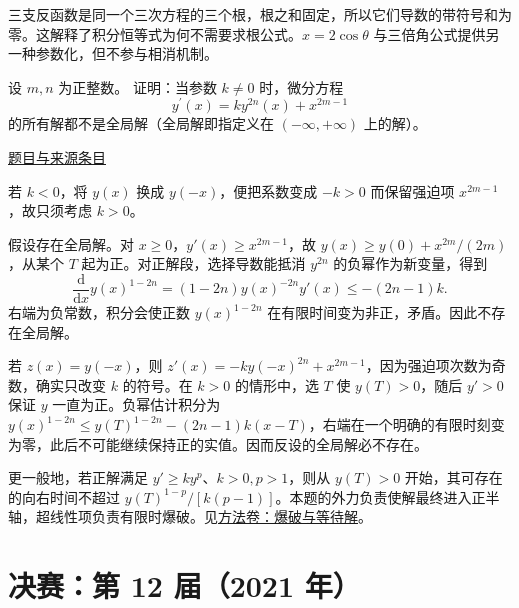\documentclass[12pt,fontset=fandol]{ctexart}
\begin{document}
\begin{remark}[方法与条件]三支反函数是同一个三次方程的三个根，根之和固定，所以它们导数的带符号和为零。这解释了积分恒等式为何不需要求根公式。$x=2\cos\theta$ 与三倍角公式提供另一种参数化，但不参与相消机制。\end{remark}

\begin{example}\label{ex:fin11-low:9}\label{pr:fin11-low:9}

设 $m, n$ 为正整数。 证明：当参数 $k \neq 0$ 时，微分方程
\[
y^{\prime}(x) = ky^{2n}(x) + x^{2m-1}
\]
的所有解都不是全局解（全局解即指定义在 $(-\infty,+\infty)$ 上的解）。

\par\href{https://github.com/lzxcr/cmc-mathematics/blob/64916fa1fdbc3e444a652eca204d5669058ee321/src/problems/finals/11/10.md}{题目与来源条目}

\end{example}

\begin{solve}\label{ans:fin11-low:9}

若 $k<0$，将 $y(x)$ 换成 $y(-x)$，便把系数变成 $-k>0$ 而保留强迫项 $x^{2m-1}$，故只须考虑 $k>0$。

假设存在全局解。对 $x\geq0$，$y'(x)\geq x^{2m-1}$，故 $y(x)\geq y(0)+x^{2m}/(2m)$，从某个 $T$ 起为正。对正解段，选择导数能抵消 $y^{2n}$ 的负幂作为新变量，得到
\[
\frac{\mathrm d}{\mathrm dx}y(x)^{1-2n}=(1-2n)y(x)^{-2n}y'(x)\leq-(2n-1)k.
\]
右端为负常数，积分会使正数 $y(x)^{1-2n}$ 在有限时间变为非正，矛盾。因此不存在全局解。

若 $z(x)=y(-x)$，则 $z'(x)=-ky(-x)^{2n}+x^{2m-1}$，因为强迫项次数为奇数，确实只改变 $k$ 的符号。在 $k>0$ 的情形中，选 $T$ 使 $y(T)>0$，随后 $y'>0$ 保证 $y$ 一直为正。负幂估计积分为 $y(x)^{1-2n}\le y(T)^{1-2n}-(2n-1)k(x-T)$，右端在一个明确的有限时刻变为零，此后不可能继续保持正的实值。因而反设的全局解必不存在。

\end{solve}

\begin{remark}[方法与条件]更一般地，若正解满足 $y'\geq ky^p$、$k>0,p>1$，则从 $y(T)>0$ 开始，其可存在的向右时间不超过 $y(T)^{1-p}/[k(p-1)]$。本题的外力负责使解最终进入正半轴，超线性项负责有限时爆破。见\hyperref[app:dynamics-blowup]{方法卷：爆破与等待解}。\end{remark}

\section{决赛：第 12 届（2021 年）}
\end{document}
